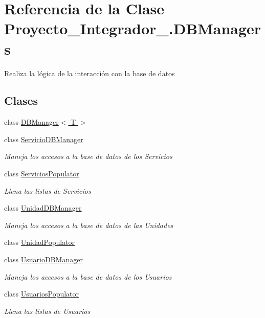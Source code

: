 \hypertarget{class_proyecto___integrador__3_1_1_d_b_managers}{\section{Referencia de la Clase Proyecto\-\_\-\-Integrador\-\_.\-D\-B\-Managers}
\label{class_proyecto___integrador__3_1_1_d_b_managers}
}


Realiza la lógica de la interacción con la base de datos  


\subsection*{Clases}
\begin{DoxyCompactItemize}
\item 
class \hyperlink{class_proyecto___integrador__3_1_1_d_b_managers_1_1_d_b_manager_3_01_t_01_4}{D\-B\-Manager$<$ T $>$}
\item 
class \hyperlink{class_proyecto___integrador__3_1_1_d_b_managers_1_1_servicio_d_b_manager}{Servicio\-D\-B\-Manager}
\begin{DoxyCompactList}\small\item\em Maneja los accesos a la base de datos de los Servicios \end{DoxyCompactList}\item 
class \hyperlink{class_proyecto___integrador__3_1_1_d_b_managers_1_1_servicios_populator}{Servicios\-Populator}
\begin{DoxyCompactList}\small\item\em Llena las listas de Servicios \end{DoxyCompactList}\item 
class \hyperlink{class_proyecto___integrador__3_1_1_d_b_managers_1_1_unidad_d_b_manager}{Unidad\-D\-B\-Manager}
\begin{DoxyCompactList}\small\item\em Maneja los accesos a la base de datos de las Unidades \end{DoxyCompactList}\item 
class \hyperlink{class_proyecto___integrador__3_1_1_d_b_managers_1_1_unidad_populator}{Unidad\-Populator}
\item 
class \hyperlink{class_proyecto___integrador__3_1_1_d_b_managers_1_1_usuario_d_b_manager}{Usuario\-D\-B\-Manager}
\begin{DoxyCompactList}\small\item\em Maneja los accesos a la base de datos de los Usuarios \end{DoxyCompactList}\item 
class \hyperlink{class_proyecto___integrador__3_1_1_d_b_managers_1_1_usuarios_populator}{Usuarios\-Populator}
\begin{DoxyCompactList}\small\item\em Llena las listas de Usuarios \end{DoxyCompactList}\end{DoxyCompactItemize}
